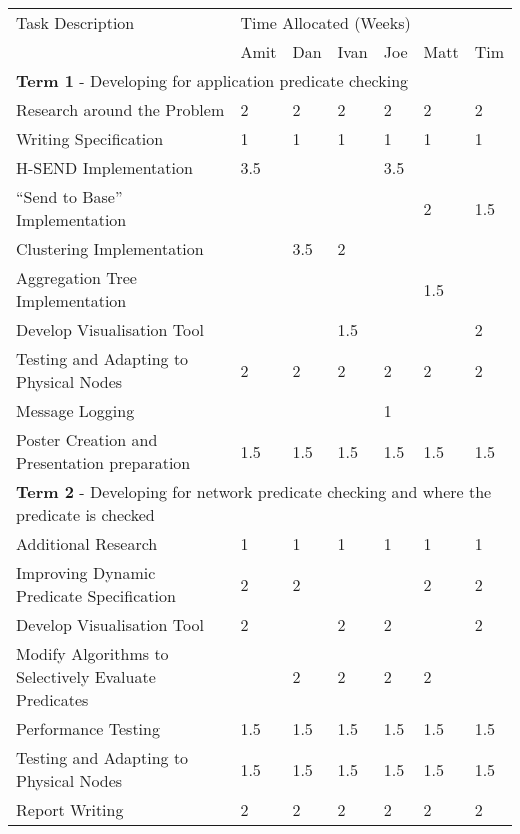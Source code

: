 \begin{table}[H]
	\centering
	\begin{tabular}{| l | l | l | l | l | l | l |}
	\hline
	Task Description & \multicolumn{6}{l|}{Time Allocated (Weeks)}\\
	~ & Amit & Dan & Ivan & Joe & Matt & Tim \\
	\hline
	\hline
	\multicolumn{7}{|l|}{\textbf{Term 1} - Developing for application predicate checking} \\
	\hline


	Research around the Problem & 2 & 2 & 2 & 2 & 2 & 2\\
	Writing Specification & 1 & 1 & 1 & 1 & 1 & 1\\
	H-SEND Implementation & 3.5 & ~ & ~ & 3.5 & ~ & ~\\
	``Send to Base'' Implementation & ~ & ~ & ~ & ~ & 2 & 1.5\\
	Clustering Implementation & ~ & 3.5 & 2 & ~ & ~ & ~\\
	Aggregation Tree Implementation & ~ & ~ & ~ & ~ & 1.5 & ~\\
	Develop Visualisation Tool & ~ & ~ & 1.5 & ~ & ~ & 2\\
	Testing and Adapting to Physical Nodes & 2 & 2 & 2 & 2 & 2 & 2\\
	Message Logging & ~ & ~ & ~ & 1 & ~ & ~\\
	Poster Creation and Presentation preparation & 1.5 & 1.5 & 1.5 & 1.5 & 1.5 & 1.5\\

	\hline
	\hline
	\multicolumn{7}{|l|}{\textbf{Term 2} - Developing for network predicate checking and where the predicate is checked} \\
	\hline
	
	Additional Research & 1 & 1 & 1 & 1 & 1 & 1\\
	Improving Dynamic Predicate Specification & 2 & 2 & ~ & ~ & 2 & 2\\
	Develop Visualisation Tool & 2 & ~ & 2 & 2 & ~ & 2\\
	Modify Algorithms to Selectively Evaluate Predicates & ~ & 2 & 2 & 2 & 2 & ~\\
	Performance Testing & 1.5 & 1.5 & 1.5 & 1.5 & 1.5 & 1.5\\
	Testing and Adapting to Physical Nodes & 1.5 & 1.5 & 1.5 & 1.5 & 1.5 & 1.5\\
	Report Writing & 2 & 2 & 2 & 2 & 2 & 2\\
	
	\hline
	
	\end{tabular}
\end{table}


